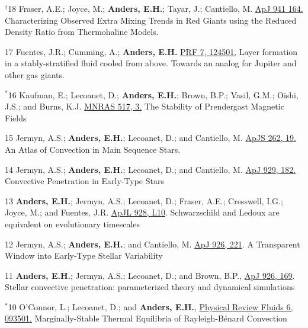       {$^\dagger$18}
      {
        Fraser, A.E.; Joyce, M.; \textbf{Anders, E.H.}; Tayar, J.; Cantiello, M. 
        \href{https://iopscience.iop.org/article/10.3847/1538-4357/aca024}{ApJ 941 164.}
      }
      {Characterizing Observed Extra Mixing Trends in Red Giants using the Reduced Density Ratio from Thermohaline Models.}

\cvpub{}
      {17}
      {
        Fuentes, J.R.; Cumming, A.; \textbf{Anders, E.H.}
        \href{https://journals.aps.org/prfluids/abstract/10.1103/PhysRevFluids.7.124501}{PRF 7, 124501.}
      }
      {Layer formation in a stably-stratified fluid cooled from above. Towards an analog for Jupiter and other gas giants.}


\cvpub{}
      {$^*$16}
      {
        Kaufman, E.; Lecoanet, D.; \textbf{Anders, E.H.}; Brown, B.P.; Vasil, G.M.; Oishi, J.S.; and Burns, K.J.
        \href{https://academic.oup.com/mnras/article/517/3/3332/6748231?login=true}{MNRAS 517, 3.}
      }
      {The Stability of Prendergast Magnetic Fields}

\cvpub{}
	  {15}
	  {
		Jermyn, A.S.; \textbf{Anders, E.H.}; Lecoanet, D.; and Cantiello, M.
        \href{https://iopscience.iop.org/article/10.3847/1538-4365/ac7cee}{ApJS 262, 19.}
       }
	  {An Atlas of Convection in Main Sequence Stars.}

\cvpub{}
	  {14}
	  {
		Jermyn, A.S.; \textbf{Anders, E.H.}; Lecoanet, D.; and Cantiello, M. 
        \href{https://iopscience.iop.org/article/10.3847/1538-4357/ac5f08}{ApJ 929, 182.}
	  }
	  {Convective Penetration in Early-Type Stars}

\cvpub{}
	  {13}
	  {
		\textbf{Anders, E.H.}; Jermyn, A.S.; Lecoanet, D.; Fraser, A.E.; Cresswell, I.G.; Joyce, M.; and Fuentes, J.R. 
        \href{https://iopscience.iop.org/article/10.3847/2041-8213/ac5cb5}{ApJL 928, L10}.
	  }
	  {Schwarzschild and Ledoux are equivalent on evolutionary timescales}

\cvpub{}
	  {12}
	  {
		Jermyn, A.S.; \textbf{Anders, E.H.}; and Cantiello, M. 
        \href{https://iopscience.iop.org/article/10.3847/1538-4357/ac4e89}{ApJ 926, 221}.
	  }
	  {A Transparent Window into Early-Type Stellar Variability}

\cvpub{}
	  {11}
	  {
		\textbf{Anders, E.H.}; Jermyn, A.S.; Lecoanet, D.; and Brown, B.P., 
        \href{https://iopscience.iop.org/article/10.3847/1538-4357/ac408d}{ApJ 926, 169}.
	  }
	  {Stellar convective penetration: parameterized theory and dynamical simulations}

	  {$^*$10}
	  {
		O'Connor, L.; Lecoanet, D.; and \textbf{Anders, E.H.}, 
		  \href{https://journals.aps.org/prfluids/abstract/10.1103/PhysRevFluids.6.093501}{Physical Review Fluids 6, 093501.}
	  }
	  {Marginally-Stable Thermal Equilibria of Rayleigh-B\'{e}nard Convection}

